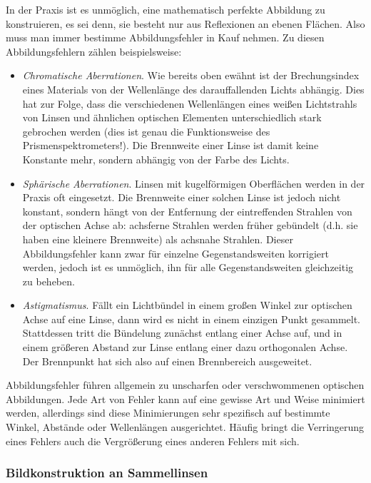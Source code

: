 \documentclass{article}
\begin{document}
In der Praxis ist es unmöglich, eine mathematisch perfekte Abbildung
zu konstruieren, es sei denn, sie besteht nur aus Reflexionen an ebenen Flächen.
Also muss man immer bestimme Abbildungsfehler in Kauf nehmen.
Zu diesen Abbildungsfehlern zählen beispielsweise:
\begin{itemize}
    \item \textit{Chromatische Aberrationen}. Wie bereits oben ewähnt ist der
    Brechungsindex eines Materials von der Wellenlänge des darauffallenden Lichts
    abhängig. Dies hat zur Folge, dass die verschiedenen Wellenlängen eines
    weißen Lichtstrahls von Linsen und ähnlichen optischen Elementen unterschiedlich
    stark gebrochen werden (dies ist genau die Funktionsweise des
    Prismenspektrometers!). Die Brennweite einer Linse ist damit keine Konstante
    mehr, sondern abhängig von der Farbe des Lichts.

    \item \textit{Sphärische Aberrationen}. Linsen mit kugelförmigen Oberflächen
    werden in der Praxis oft eingesetzt. Die Brennweite einer solchen Linse
    ist jedoch nicht konstant, sondern hängt von der Entfernung der eintreffenden
    Strahlen von der optischen Achse ab: achsferne Strahlen werden früher gebündelt
    (d.h. sie haben eine kleinere Brennweite) als achsnahe Strahlen.
    Dieser Abbildungsfehler kann zwar für einzelne Gegenstandsweiten korrigiert
    werden, jedoch ist es unmöglich, ihn für alle Gegenstandsweiten gleichzeitig
    zu beheben.

    \item \textit{Astigmatismus}. Fällt ein Lichtbündel in einem großen Winkel
    zur optischen Achse auf eine Linse, dann wird es nicht in einem einzigen
    Punkt gesammelt. Stattdessen tritt die Bündelung zunächst entlang einer
    Achse auf, und in einem größeren Abstand zur Linse entlang einer dazu
    orthogonalen Achse. Der Brennpunkt hat sich also auf einen Brennbereich
    ausgeweitet.
\end{itemize}

Abbildungsfehler führen allgemein zu unscharfen oder verschwommenen optischen
Abbildungen. Jede Art von Fehler kann auf eine gewisse Art und Weise minimiert
werden, allerdings sind diese Minimierungen sehr spezifisch auf bestimmte
Winkel, Abstände oder Wellenlängen ausgerichtet. Häufig bringt die Verringerung
eines Fehlers auch die Vergrößerung eines anderen Fehlers mit sich.

\cite[69--116]{zinth}


\subsubsection{Bildkonstruktion an Sammellinsen}
\end{document}
